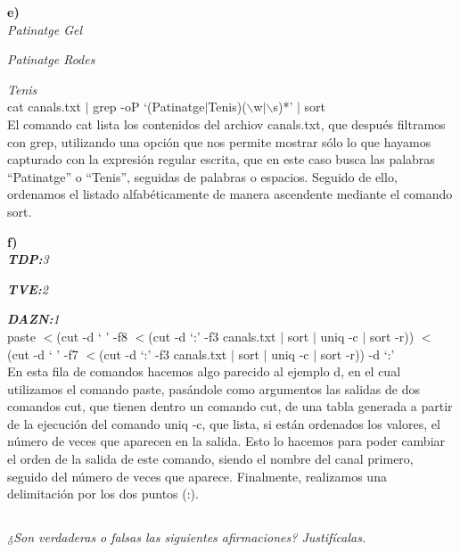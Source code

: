 \documentclass[spanish]{article}
\begin{document}
\textbf{e)}\\

\textit{Patinatge Gel}

\textit{Patinatge Rodes}

\textit{Tenis}\\

cat canals.txt $\vert$ grep -oP
`(Patinatge$\vert$Tenis)($\backslash$w$\vert$$\backslash$s)*'
$\vert$ sort\\

El comando cat lista los contenidos del archiov canals.txt,
que después filtramos con grep, utilizando una opción que
nos permite mostrar sólo lo que hayamos capturado con la
expresión regular escrita, que en este caso busca las
palabras ``Patinatge'' o ``Tenis'', seguidas de palabras o
espacios. Seguido de ello, ordenamos el listado
alfabéticamente de manera ascendente mediante el comando
sort.

\newpage

\textbf{f)}\\

\textit{\textbf{TDP:}3}

\textit{\textbf{TVE:}2}

\textit{\textbf{DAZN:}1}\\

paste \(<\)(cut -d ` ' -f8 \(<\)(cut -d `:' -f3 canals.txt
$\vert$ sort $\vert$ uniq -c $\vert$ sort -r)) \(<\)(cut -d
` ' -f7 \(<\)(cut -d `:' -f3 canals.txt $\vert$ sort $\vert$
uniq -c $\vert$ sort -r)) -d `:'\\

En esta fila de comandos hacemos algo parecido al ejemplo d,
en el cual utilizamos el comando paste, pasándole como
argumentos las salidas de dos comandos cut, que tienen
dentro un comando cut, de una tabla generada a partir de la
ejecución del comando uniq -c, que lista, si están
ordenados los valores, el número de veces que aparecen en la
salida. Esto lo hacemos para poder cambiar el orden de la
salida de este comando, siendo el nombre del canal primero,
seguido del número de veces que aparece. Finalmente,
realizamos una delimitación por los dos puntos (:).

\subsection{}

\textit{¿Son verdaderas o falsas las siguientes
afirmaciones? Justifícalas.}

\subsubsection{}
\end{document}
